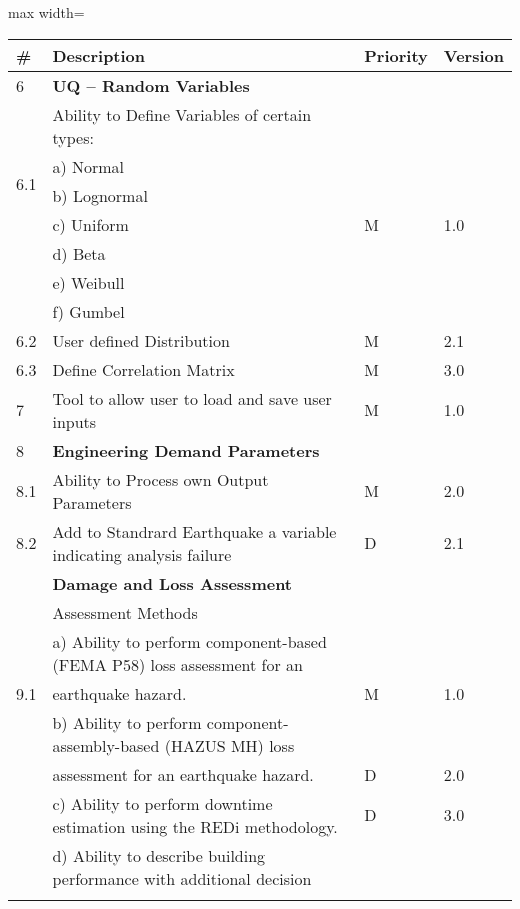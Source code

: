 \begin{table}[hbt!]                 
  \centering
\begin{adjustbox}{max width=\textwidth}            
  \begin{tabular}{llll}                    
    \toprule
      \# & Description & Priority & Version \\ \hline
    6 & \textbf{UQ – Random Variables} &  &  \\ \hline
	\multirow{5}{*}{6.1} & Ability to Define Variables of certain types: &  &  \\ 
	 & a)     Normal &  &  \\ 
	 & b)     Lognormal &  &  \\ 
	 & c)     Uniform & M  & 1.0 \\ 
	 & d)     Beta &  &  \\ 
	 & e)     Weibull &  &  \\ 
	 & f)     Gumbel &  &  \\ \hline
	6.2 & User defined Distribution & M & 2.1 \\ \hline
	6.3 & Define Correlation Matrix & M & 3.0 \\ \hline
	7 & Tool to allow user to load and save user inputs & M & 1.0 \\ \hline
	8 & \textbf{Engineering Demand Parameters} &  &  \\ \hline
	8.1 & Ability to Process own Output Parameters & M & 2.0  \\ \hline
	8.2 & Add to Standrard Earthquake a variable indicating analysis failure & D & 2.1  \\ \hline
\softwareSwitch{PBE}{
    9 & \textbf{Damage and Loss Assessment} & & \\ \hline
    \multirow{5}{*}{9.1} & Assessment Methods & & \\
     & a) Ability to perform component-based (FEMA P58) loss assessment for an &&\\
     & \hspace{1em} earthquake hazard. & M & 1.0 \\
     & b) Ability to perform component-assembly-based (HAZUS MH) loss &&\\
     & \hspace{1em} assessment for an earthquake hazard. & D & 2.0 \\
     & c) Ability to perform downtime estimation using the REDi methodology. & D & 3.0 \\
     & d) Ability to describe building performance with additional decision &&\\
}
\end{tabular}
\end{adjustbox}
\end{table}
